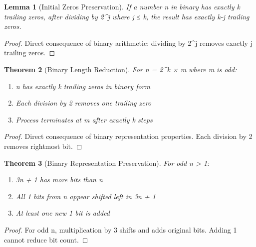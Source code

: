 \documentclass[11pt]{article}
\newtheorem{theorem}{Theorem}[section]
\newtheorem{lemma}[theorem]{Lemma}
\begin{document}
\begin{lemma}[Initial Zeros Preservation]
If a number n in binary has exactly k trailing zeros, after dividing by 2^j where j ≤ k, the result has exactly k-j trailing zeros.
\end{lemma}

\begin{proof}
Direct consequence of binary arithmetic: dividing by 2^j removes exactly j trailing zeros.
\end{proof}


\begin{theorem}[Binary Length Reduction]
For n = 2^k × m where m is odd:
\begin{enumerate}
    \item n has exactly k trailing zeros in binary form
    \item Each division by 2 removes one trailing zero
    \item Process terminates at m after exactly k steps
\end{enumerate}
\end{theorem}

\begin{proof}
Direct consequence of binary representation properties. Each division by 2 removes rightmost bit.
\end{proof}

\begin{theorem}[Binary Representation Preservation]
For odd n > 1:
\begin{enumerate}
    \item 3n + 1 has more bits than n
    \item All 1 bits from n appear shifted left in 3n + 1
    \item At least one new 1 bit is added
\end{enumerate}
\end{theorem}

\begin{proof}
For odd n, multiplication by 3 shifts and adds original bits. Adding 1 cannot reduce bit count.
\end{proof}
\end{document}
